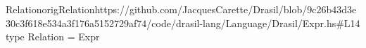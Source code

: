 \begin{haskell}{Relation}{origRelation}{https://github.com/JacquesCarette/Drasil/blob/9c26b43d3e30c3f618e534a3f176a5152729af74/code/drasil-lang/Language/Drasil/Expr.hs\#L14}
type Relation = Expr
\end{haskell}
